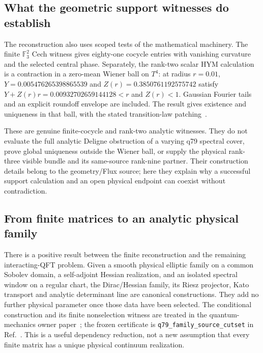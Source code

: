 \documentclass[11pt]{article}
\begin{document}
\subsection{What the geometric support witnesses do establish}

The reconstruction also uses scoped tests of the mathematical machinery.  The finite
$\mathbb F_3^2$ Cech witness gives eighty-one cocycle entries with vanishing curvature
and the selected central phase.  Separately, the rank-two scalar HYM calculation is a
contraction in a zero-mean Wiener ball on $T^4$: at radius $r=0.01$,
$Y=0.005476265398865539$ and $Z(r)=0.3850761192575742$ satisfy
$Y+Z(r)r=0.00932702659144128<r$ and $Z(r)<1$.  Gaussian Fourier tails and an explicit
roundoff envelope are included.  The result gives existence and uniqueness in that ball,
with the stated transition-law patching~\cite{SMGeometricSupport}.

These are genuine finite-cocycle and rank-two analytic witnesses.  They do not evaluate the
full analytic Deligne obstruction of a varying q79 spectral cover, prove global uniqueness
outside the Wiener ball, or supply the physical rank-three visible bundle and its
same-source rank-nine partner.  Their construction details belong to the geometry/Flux
source; here they explain why a successful support calculation and an open physical
endpoint can coexist without contradiction.

\subsection{From finite matrices to an analytic physical family}
\label{sec:analytic-family-import}

There is a positive result between the finite reconstruction and the remaining
interacting-QFT problem.  Given a smooth physical elliptic family on a common
Sobolev domain, a self-adjoint Hessian realization, and an isolated spectral
window on a regular chart, the Dirac/Hessian family, its Riesz projector,
Kato transport and analytic determinant line are canonical constructions.
They add no further physical parameter once those data have been selected.
The conditional construction and its finite nonselection witness are treated
in the quantum-mechanics owner paper~\cite{QMFamilyOwner}; the frozen certificate
is \nolinkurl{q79_family_source_cutset} in Ref.~\cite{MTTResults}.
This is a useful dependency reduction, not a new assumption that every finite
matrix has a unique physical continuum realization.
\end{document}
